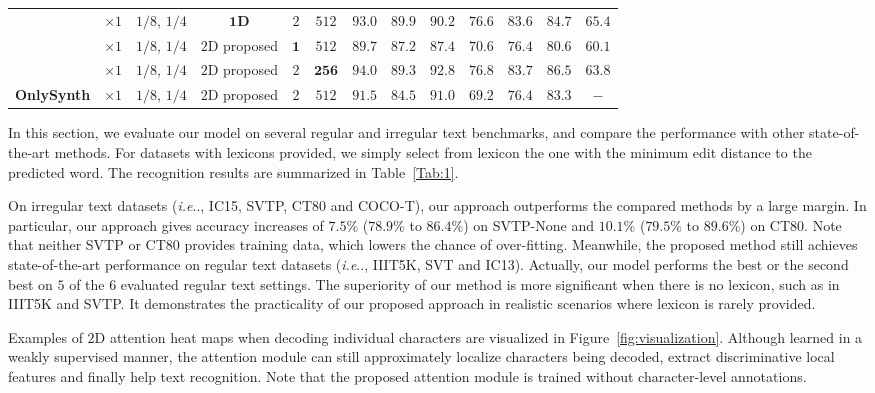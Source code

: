 \documentclass[letterpaper]{article} \usepackage{aaai19}  \usepackage{times}  \usepackage{helvet}  \usepackage{courier}  \usepackage{url}  \usepackage{graphicx}  \usepackage{amsmath}
\makeatletter
\DeclareRobustCommand\onedot{\futurelet\@let@token\@onedot}
\def\@onedot{\ifx\@let@token.\else.\null\fi\xspace}
\def\ie{\emph{i.e}\onedot} \def\Ie{\emph{I.e}\onedot}
\makeatother
\begin{document}
\begin{table*}[th!]
\begin{center}
{\begin{tabular}{c|c|c|c|c|c|c|c|c|c|c|c|c}
		   & $\times 1$ &$1/8$, $1/4$ & \bf{$\mathbf{1}$D}  & $2$ & $512$ & $93.0$ & $89.9$ &  $90.2$ & $76.6$ & $83.6$ & $84.7$ & $65.4$\\
				\cline{2-13}
			 & $\times 1$ &$1/8$, $1/4$ & $2$D proposed & $\mathbf{1}$ & $512$ & $89.7$ & $87.2$ & $87.4$ & $70.6$ & $76.4$ & $80.6$&  $60.1$\\
			 & $\times 1$ &$1/8$, $1/4$ & $2$D proposed & $2$ & $\mathbf{256}$ & $94.0$ & $89.3$ & $92.8$ & $76.8$ & $83.7$ & $86.5$ & $63.8$ \\
			\hline
			\textbf{OnlySynth} & $\times 1$ &$1/8$, $1/4$ & $2$D proposed & $2$ & $512$ & $91.5$ & $84.5$ & $91.0$ & $69.2$ &$76.4$ & $83.3$ & $-$ \\
			\hline
		\end{tabular}
		}

	\end{center}
\end{table*}

In this section, we evaluate our model on several regular and irregular text benchmarks, and compare the performance with other state-of-the-art methods.
For datasets with lexicons provided, we simply select from lexicon the one with the minimum edit distance to the predicted word.
The recognition results are summarized in Table~\ref{Tab:1}.

On irregular text datasets (\ie, IC15, SVTP, CT80 and COCO-T),
our approach outperforms the compared methods by a large margin.
In particular, our approach gives accuracy increases of $7.5\%$ ($78.9\%$ to $86.4\%$) on SVTP-None and $10.1\%$ ($79.5\%$ to $89.6\%$) on CT80.
Note that neither SVTP or CT80 provides training data, which lowers the chance of over-fitting.
Meanwhile, the proposed method still achieves state-of-the-art performance on regular text datasets (\ie, IIIT5K, SVT and IC13).
Actually, our model performs the best or the second best on $5$ of the $6$ evaluated regular text settings.
The superiority of our method is more significant when there is no lexicon, such as in IIIT5K and SVTP.
It demonstrates the practicality of our proposed approach in realistic scenarios where lexicon is rarely provided.


Examples of $2$D attention heat maps when decoding individual characters are visualized in Figure~\ref{fig:visualization}.
Although learned in a weakly supervised manner, the attention module can still approximately localize characters being decoded,
extract discriminative local features and finally help text recognition. Note that the proposed attention module is trained without character-level annotations.
\end{document}
